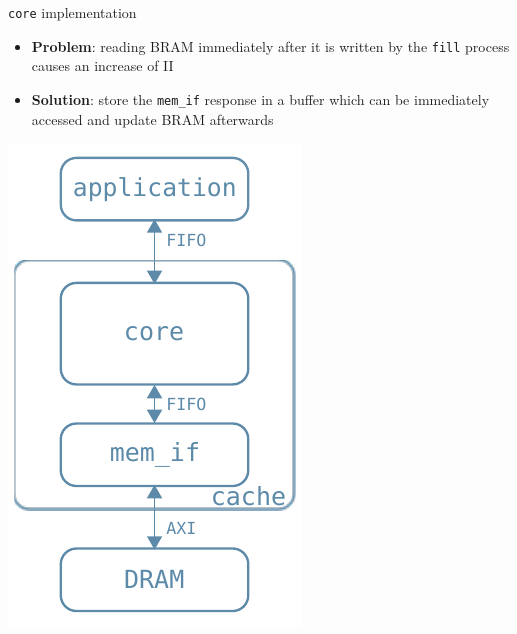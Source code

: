 \documentclass{beamer}
\begin{document}
\begin{frame}{\texttt{core} implementation}
	\begin{minipage}{.7\textwidth}
		\begin{itemize}
			\item \textbf{Problem}:
				reading BRAM immediately after it is written
				by the \texttt{fill} process causes an increase
				of II
			\item \textbf{Solution}:
				store the \texttt{mem\_if} response in a buffer
				which can be immediately accessed and update BRAM
				afterwards
		\end{itemize}
	\end{minipage}
	\begin{minipage}{.29\textwidth}
		\begin{center}
			\includegraphics[width=.9\textwidth,height=.9\textheight,keepaspectratio]{internal_arch.pdf}
		\end{center}
	\end{minipage}
\end{frame}
\end{document}
